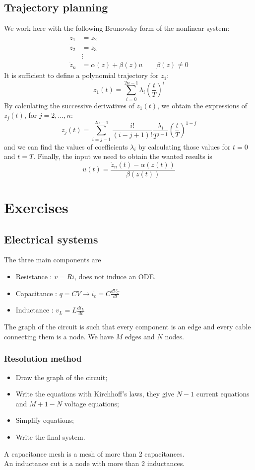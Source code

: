 \documentclass[12pt, openany]{report}
\theoremstyle{definition}
\begin{document}
\section{Trajectory planning}
We work here with the following Brunovsky form of the nonlinear system:
\begin{align}
    \dot z_1 &= z_2 \nonumber\\
    \dot z_2 &= z_3 \nonumber\\
    &\vdots \nonumber\\
    \dot z_n &= \alpha(z) + \beta(z)u \qquad \beta(z)\neq 0 
\end{align}
It is sufficient to define a polynomial trajectory for \(z_1\):
\begin{equation}
    z_1(t) = \sum_{i=0}^{2n-1}\lambda_i \left(\frac{t}{T}\right)^i
\end{equation}
By calculating the successive derivatives of \(z_1(t)\), we obtain the expressions of \(z_j(t)\), for \(j=2,\dots,n\):
\begin{equation}
    z_j(t) = \sum_{i=j-1}^{2n-1}\frac{i!}{(i-j+1)!}\frac{\lambda_i}{T^{j-1}}\left(\frac{t}{T}\right)^{1-j}
\end{equation}
and we can find the values of coefficients \(\lambda_i\) by calculating those values for \(t=0\) and \(t=T\). Finally, the input we need to obtain the wanted results is 
\begin{equation}
    u(t) = \frac{\dot z_n(t)-\alpha(z(t))}{\beta(z(t))}
\end{equation}
\chapter{Exercises}
\section{Electrical systems}
The three main components are 
\begin{itemize}
    \item Resistance : $v=Ri$, does not induce an ODE.
    \item Capacitance : $q=CV\rightarrow i_c = C\frac{dV_C}{dt}$
    \item Inductance : $v_L = L\frac{di_L}{dt}$
\end{itemize}
The graph of the circuit is such that every component is an edge and every cable connecting them is a node. We have $M$ edges and $N$ nodes.
\subsection{Resolution method}
\begin{itemize}
    \item Draw the graph of the circuit;
    \item Write the equations with Kirchhoff's laws, they give $N-1$ current equations and $M+1-N$ voltage equations;
    \item Simplify equations;
    \item Write the final system.
\end{itemize}
A capacitance mesh is a mesh of more than 2 capacitances. \\
An inductance cut is a node with more than 2 inductances. 
\end{document}
